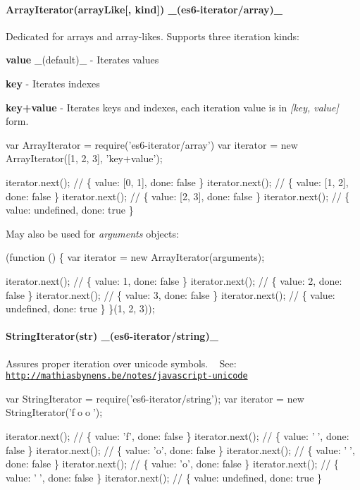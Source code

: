 \paragraph*{Array\+Iterator(array\+Like\mbox{[}, kind\mbox{]}) \+\_\+(es6-\/iterator/array)\+\_\+}

Dedicated for arrays and array-\/likes. Supports three iteration kinds\+:
\begin{DoxyItemize}
\item {\bfseries value} \+\_\+(default)\+\_\+ -\/ Iterates values
\item {\bfseries key} -\/ Iterates indexes
\item {\bfseries key+value} -\/ Iterates keys and indexes, each iteration value is in {\itshape \mbox{[}key, value\mbox{]}} form.
\end{DoxyItemize}


\begin{DoxyCode}
var ArrayIterator = require('es6-iterator/array')
var iterator = new ArrayIterator([1, 2, 3], 'key+value');

iterator.next(); // \{ value: [0, 1], done: false \}
iterator.next(); // \{ value: [1, 2], done: false \}
iterator.next(); // \{ value: [2, 3], done: false \}
iterator.next(); // \{ value: undefined, done: true \}
\end{DoxyCode}


May also be used for {\itshape arguments} objects\+:


\begin{DoxyCode}
(function () \{
  var iterator = new ArrayIterator(arguments);

  iterator.next(); // \{ value: 1, done: false \}
  iterator.next(); // \{ value: 2, done: false \}
  iterator.next(); // \{ value: 3, done: false \}
  iterator.next(); // \{ value: undefined, done: true \}
\}(1, 2, 3));
\end{DoxyCode}


\paragraph*{String\+Iterator(str) \+\_\+(es6-\/iterator/string)\+\_\+}

Assures proper iteration over unicode symbols. ~\newline
See\+: \href{http://mathiasbynens.be/notes/javascript-unicode}{\tt http\+://mathiasbynens.\+be/notes/javascript-\/unicode}


\begin{DoxyCode}
var StringIterator = require('es6-iterator/string');
var iterator = new StringIterator('f🙈o🙉o🙊');

iterator.next(); // \{ value: 'f', done: false \}
iterator.next(); // \{ value: '🙈', done: false \}
iterator.next(); // \{ value: 'o', done: false \}
iterator.next(); // \{ value: '🙉', done: false \}
iterator.next(); // \{ value: 'o', done: false \}
iterator.next(); // \{ value: '🙊', done: false \}
iterator.next(); // \{ value: undefined, done: true \}
\end{DoxyCode}


